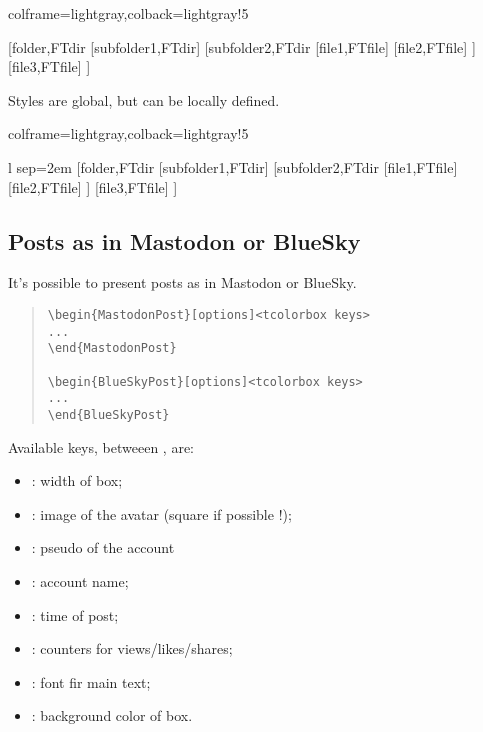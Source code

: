 \documentclass[11pt,a4paper]{ltxdoc}
\begin{document}
\begin{tcblisting}{colframe=lightgray,colback=lightgray!5}
\begin{ForestDirTree}%
    [font=\sffamily,coliconfolder=yellow!50!pink,iconfiles,coliconfile=teal,vsep=0.5em]%
    {}
    [folder,FTdir
        [subfolder1,FTdir]
        [subfolder2,FTdir
            [file1,FTfile]
            [file2,FTfile]
        ]
        [file3,FTfile]
    ]
\end{ForestDirTree}
\end{tcblisting}

Styles are global, but can be locally defined.

\begin{tcblisting}{colframe=lightgray,colback=lightgray!5}
\begin{ForestDirTree}%
    [font=\sffamily,coliconfolder=yellow!50!pink,iconfiles,coliconfile=teal,vsep=0.5em]%
    {l sep=2em}
    [folder,FTdir
        [subfolder1,FTdir]
        [subfolder2,FTdir
            [file1,FTfile]
            [file2,FTfile]
        ]
        [file3,FTfile]
    ]
\end{ForestDirTree}
\end{tcblisting}

\pagebreak

\subsection{Posts as in Mastodon or BlueSky}

It's possible to present posts as in Mastodon or BlueSky.

\begin{quote}
\begin{verbatim}
\begin{MastodonPost}[options]<tcolorbox keys>
...
\end{MastodonPost}

\begin{BlueSkyPost}[options]<tcolorbox keys>
...
\end{BlueSkyPost}
\end{verbatim}
\end{quote}

Available \textsf{keys}, betweeen \MontreCode{[...]}, are:

\begin{itemize}
	\item {}: width of box;
	\item {}: image of the avatar (square if possible !);
	\item {}: pseudo of the account
	\item {}: account name;
	\item {}: time of post;
	\item {}: counters for views/likes/shares;
	\item {}: font fir main text;
	\item {}: background color of box.
\end{itemize}
\end{document}
